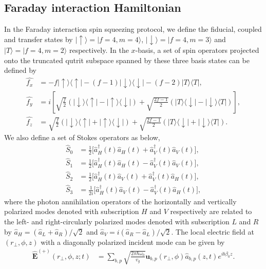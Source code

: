 \documentclass[preprint,aps,pra,onecolumn,superscriptaddress]{revtex4-1} %
\def\bra#1{\langle{#1}\rvert}%
\def\ket#1{\lvert{#1}\rangle}%
\newcommand{\smallfrac}[2]{\mbox{$\frac{#1}{#2}$}}
\begin{document}
\begin{appendix}

\section{Faraday interaction Hamiltonian} \label{Appendix::FaradayInteractionHamiltonian}
In the Faraday interaction spin squeezing protocol, we define the fiducial, coupled and transfer states by $ \ket{\uparrow}=\ket{f=4,m=4} $, $ \ket{\downarrow}=\ket{f=4,m=3} $ and $ \ket{T}=\ket{f=4,m=2} $ respectively. 
In the $ x $-basis, a set of spin operators projected onto the truncated qutrit subspace spanned by these three basis states can be defined by
\begin{align}
\hat{f_x} &= -f \ket{\uparrow}\bra{\uparrow} -(f-1)\ket{\downarrow}\bra{\downarrow}-(f-2)\ket{T}\bra{T},\\
\hat{f_y} &=i\left[\sqrt{\frac{f}{2}}\left(\ket{\downarrow}\bra{\uparrow}-\ket{\uparrow}\bra{\downarrow}\right) +\sqrt{\frac{2f-1}{2}}\left(\ket{T}\bra{\downarrow}-\ket{\downarrow}\bra{T} \right) \right] ,\\
\hat{f_z} &= \sqrt{\frac{f}{2}}\left(\ket{\downarrow}\bra{\uparrow}+\ket{\uparrow}\bra{\downarrow}\right) +\sqrt{\frac{2f-1}{2}}\left(\ket{T}\bra{\downarrow}+\ket{\downarrow}\bra{T} \right).
\end{align}
We also define a set of Stokes operators as below,
\begin{align}
\hat{S}_0 &= \smallfrac{1}{2}\big[ \hat{a}^\dag_H(t) \hat{a}_H(t)+\hat{a}^\dag_V(t) \hat{a}_V(t) \big],\\
\hat{S}_1 &= \smallfrac{1}{2}\big[ \hat{a}^\dag_H(t) \hat{a}_H(t)-\hat{a}^\dag_V(t) \hat{a}_V(t) \big],\\
\hat{S}_2 &= \smallfrac{1}{2}\big[ \hat{a}^\dag_H(t) \hat{a}_V(t)+\hat{a}^\dag_V(t) \hat{a}_H(t) \big],\\
\hat{S}_3 &= \smallfrac{1}{2i}\big[ \hat{a}^\dag_H(t) \hat{a}_V(t) -\hat{a}^\dag_V(t) \hat{a}_H(t) \big],
\end{align}
where the photon annihilation operators of the horizontally and vertically polarized modes denoted with subscription $ H $ and $ V $ respectively are related to the left- and right-circularly polarized modes denoted with subscription $ L $ and $ R $ by $ \hat{a}_{H}=(\hat{a}_L+\hat{a}_R) /\sqrt{2}$ and $ \hat{a}_{V}=i(\hat{a}_R-\hat{a}_L)/\sqrt{2} $.
The local electric field at $ (r\!_\perp,\phi,z) $ with a diagonally polarized incident mode can be given by
\begin{align}
\hat{\mathbf{E}}^{(+)}(r\!_\perp,\phi,z;t) &= \sum_{b,p} \sqrt{ \frac{2 \pi \hbar \omega_0}{ v_g} } \mathbf{u}_{b,p}(r\!_\perp,\phi) \hat{a}_{b,p}(z,t)  e^{i b \beta_0 z}.
\end{align}


\end{appendix}
\end{document}
